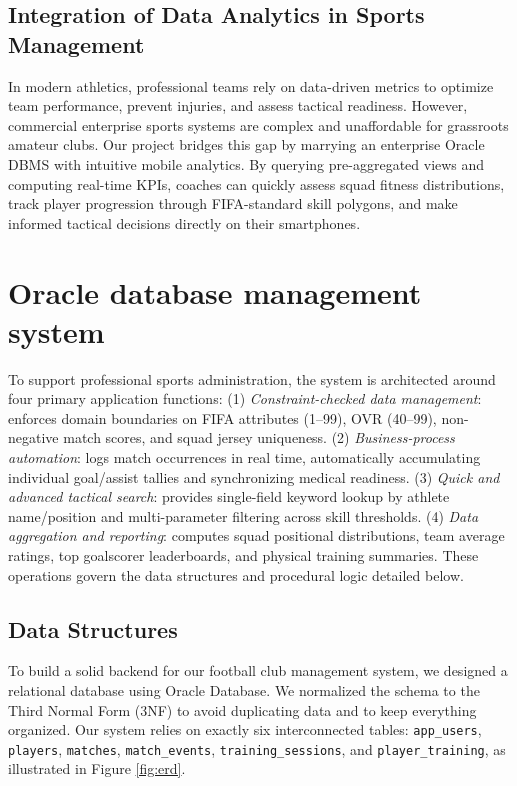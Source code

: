 \documentclass[fonts]{icst}
\begin{document}
\subsection{Integration of Data Analytics in Sports Management}
In modern athletics, professional teams rely on data-driven metrics to optimize team performance, prevent injuries, and assess tactical readiness. However, commercial enterprise sports systems are complex and unaffordable for grassroots amateur clubs. Our project bridges this gap by marrying an enterprise Oracle DBMS with intuitive mobile analytics. By querying pre-aggregated views and computing real-time KPIs, coaches can quickly assess squad fitness distributions, track player progression through FIFA-standard skill polygons, and make informed tactical decisions directly on their smartphones.

\section{Oracle database management system}\label{sec:problem_formulation}
To support professional sports administration, the system is architected around four primary application functions:
(1) \textit{Constraint-checked data management}: enforces domain boundaries on FIFA attributes (1--99), OVR (40--99), non-negative match scores, and squad jersey uniqueness.
(2) \textit{Business-process automation}: logs match occurrences in real time, automatically accumulating individual goal/assist tallies and synchronizing medical readiness.
(3) \textit{Quick and advanced tactical search}: provides single-field keyword lookup by athlete name/position and multi-parameter filtering across skill thresholds.
(4) \textit{Data aggregation and reporting}: computes squad positional distributions, team average ratings, top goalscorer leaderboards, and physical training summaries. These operations govern the data structures and procedural logic detailed below.

\subsection{Data Structures}
To build a solid backend for our football club management system, we designed a relational database using Oracle Database. We normalized the schema to the Third Normal Form (3NF) \cite{gfg_3nf} to avoid duplicating data and to keep everything organized. Our system relies on exactly six interconnected tables: \texttt{app\_users}, \texttt{players}, \texttt{matches}, \texttt{match\_events}, \texttt{training\_sessions}, and \texttt{player\_training}, as illustrated in Figure \ref{fig:erd}.
\end{document}
